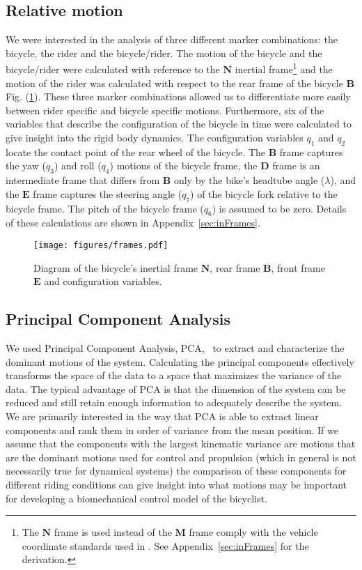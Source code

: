\subsection{Relative motion}
\label{sec:relativeMotion}
We were interested in the analysis of three different marker combinations: the
bicycle, the rider and the bicycle/rider. The motion of the bicycle and the
bicycle/rider were calculated with reference to the $\mathbf{N}$ inertial
frame\footnote[1]{The $\mathbf{N}$ frame is used instead of the $\mathbf{M}$ frame
comply with the vehicle coordinate standards used in \cite{Meijaard2007}. See
Appendix~\ref{sec:inFrames} for the derivation.} and the motion of the rider was calculated
with respect to the rear frame of
the bicycle $\mathbf{B}$ Fig. (\ref{fig:frames}). These three marker
combinations allowed us to differentiate more easily between rider specific and
bicycle specific motions. Furthermore, six of the variables that describe the
configuration of the bicycle in time were calculated to give insight into the
rigid body dynamics. The configuration variables $q_1$ and $q_2$ locate the
contact point of the rear wheel of the bicycle. The $\mathbf{B}$ frame captures
the yaw ($q_3$) and roll ($q_4$) motions
of the bicycle frame, the $\mathbf{D}$ frame is an intermediate frame that
differs from $\mathbf{B}$ only by the bike's headtube angle ($\lambda$), and the
$\mathbf{E}$ frame captures the steering angle ($q_7$) of the bicycle fork relative to
the bicycle frame. The pitch of the bicycle frame ($q_6$) is assumed to be zero. Details of these calculations are shown in
Appendix~\ref{sec:inFrames}.
\begin{figure}[tbp]
    \begin{center}
        \texttt{[image: figures/frames.pdf]}
    \end{center}
    \caption{Diagram of the bicycle's inertial frame $\mathbf{N}$, rear frame $\mathbf{B}$, front frame $\mathbf{E}$ and configuration variables.}
    \label{fig:frames}
\end{figure}

\subsection{Principal Component Analysis}
\label{sec:pca}
We used Principal Component Analysis, PCA,~\cite{Jolliffe2002} to extract and
characterize the dominant motions of the system. Calculating the principal
components effectively transforms the space of the data to a space that
maximizes the variance of the data. The typical advantage of PCA is that the
dimension of the system can be reduced and still retain enough information to
adequately describe the system. We are primarily interested in the way that PCA
is able to extract linear components and rank them in order of variance from
the mean position. If we assume that the components with the largest kinematic
variance are motions that are the dominant motions used for control and
propulsion (which in general is not necessarily true for dynamical systems) the
comparison of these components for different riding conditions can give insight
into what motions may be important for developing a biomechanical control model
of the bicyclist.

